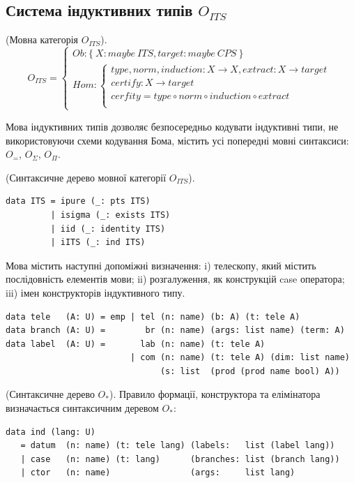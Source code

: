 \newpage
\subsection{Система індуктивних типів $O_{ITS}$}

\begin{definition} (Мовна категорія $O_{ITS}$).
\begin{equation}
O_{ITS} =
\begin{cases}
Ob: \{\ X: maybe\ ITS, target: maybe\ CPS\ \} \\
Hom: \begin{cases}
type,norm,induction: X \rightarrow X, extract: X \rightarrow target \\
certify : X \rightarrow target \\
cerfity = type \circ norm \circ induction \circ extract \\
\end{cases}
\end{cases}
\end{equation}
\end{definition}

Мова індуктивних типів дозволяє безпосередньо кодувати індуктивні типи,
не використовуючи схеми кодування Бома, містить усі попередні мовні синтаксиси:
$O_=$, $O_\Sigma$, $O_\Pi$.

\begin{definition} (Синтаксичне дерево мовної категорії $O_{ITS}$).
\begin{lstlisting}
data ITS = ipure (_: pts ITS)
         | isigma (_: exists ITS)
         | iid (_: identity ITS)
         | iITS (_: ind ITS)
\end{lstlisting}
\end{definition}

Мова містить наступні допоміжні визначення: i) телескопу,
який містить послідовність елементів мови; ii) розгалуження,
як конструкцій case оператора; iii) імен конструкторів індуктивного типу.

\begin{lstlisting}
data tele   (A: U) = emp | tel (n: name) (b: A) (t: tele A)
data branch (A: U) =        br (n: name) (args: list name) (term: A)
data label  (A: U) =       lab (n: name) (t: tele A)
                         | com (n: name) (t: tele A) (dim: list name)
                               (s: list  (prod (prod name bool) A))
\end{lstlisting}

\begin{definition} (Синтаксичне дерево $O_*$).
Правило формації, конструктора та елімінатора визначається синтаксичним деревом $O_*$:
\begin{lstlisting}
data ind (lang: U)
   = datum  (n: name) (t: tele lang) (labels:   list (label lang))
   | case   (n: name) (t: lang)      (branches: list (branch lang))
   | ctor   (n: name)                (args:     list lang)
\end{lstlisting}
\end{definition}

